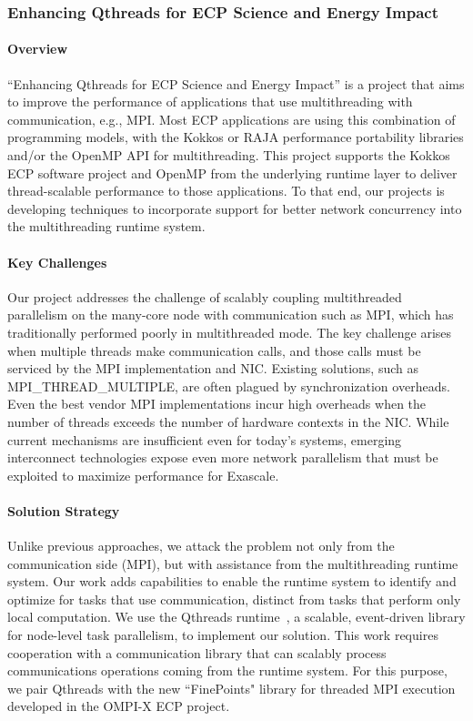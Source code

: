 \subsubsection{Enhancing Qthreads for ECP Science and Energy Impact} 


\paragraph{Overview} 

``Enhancing Qthreads for ECP Science and Energy Impact'' is a project that aims to improve the performance of applications that use multithreading with communication, e.g., MPI.  Most ECP applications are using this combination of programming models, with the Kokkos or RAJA performance portability libraries and/or the OpenMP API for multithreading.  This project supports the Kokkos ECP software project and OpenMP from the underlying runtime layer to deliver thread-scalable performance to those applications.  To that end, our projects is developing techniques to incorporate support for better network concurrency into the multithreading runtime system.

\paragraph{Key  Challenges}
Our project addresses the challenge of scalably coupling multithreaded parallelism on the many-core node with communication such as MPI, which has traditionally performed poorly in multithreaded mode.  The key challenge arises when multiple threads make communication calls, and those calls must be serviced by the MPI implementation and NIC.  Existing solutions, such as MPI\_THREAD\_MULTIPLE, are often plagued by synchronization overheads.  Even the best vendor MPI implementations incur high overheads when the number of threads exceeds the number of hardware contexts in the NIC. 
While current mechanisms are insufficient even for today's systems, emerging interconnect technologies expose even more network parallelism that must be exploited to maximize performance for Exascale.

\paragraph{Solution Strategy}

Unlike previous approaches, we attack the problem not only from the communication side (MPI), but with assistance from the multithreading runtime system.  Our work adds capabilities to enable the runtime system to identify and optimize for tasks that use communication, distinct from tasks that perform only local computation.  We use the Qthreads runtime~\cite{wheeler2008qthreads}, a scalable, event-driven library for node-level task parallelism, to implement our solution.  This work requires cooperation with a communication library that can scalably process communications operations coming from the runtime system.  For this purpose, we pair Qthreads with the new “FinePoints" library for threaded MPI execution developed in the OMPI-X ECP project.

